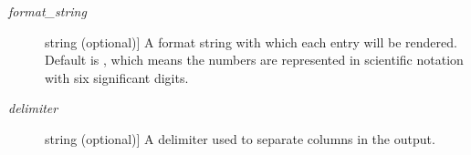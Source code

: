 \documentclass[a4paper,10pt,english]{sphinxmanual}
\begin{document}
\begin{fulllineitems}
\begin{fulllineitems}
\begin{description}
\item[{\emph{format\_string}}] \leavevmode{[}string (optional){]}
A format string with which each entry will be rendered. Default is
, which means the numbers are represented in scientific
notation with six significant digits.

\item[{\emph{delimiter}}] \leavevmode{[}string (optional){]}
A delimiter used to separate columns in the output.

\end{description}

\end{fulllineitems}


\end{fulllineitems}

\end{document}
